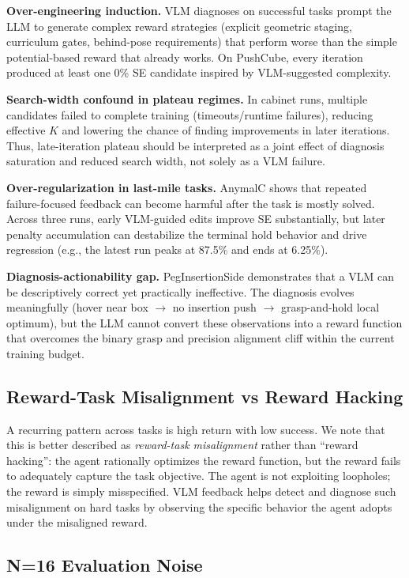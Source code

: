 \documentclass[conference]{IEEEtran}
\begin{document}
\textbf{Over-engineering induction.} VLM diagnoses on successful tasks prompt
the LLM to generate complex reward strategies (explicit geometric staging,
curriculum gates, behind-pose requirements) that perform worse than the simple
potential-based reward that already works. On PushCube, every iteration produced
at least one 0\% SE candidate inspired by VLM-suggested complexity.

\textbf{Search-width confound in plateau regimes.} In cabinet runs, multiple
candidates failed to complete training (timeouts/runtime failures), reducing
effective $K$ and lowering the chance of finding improvements in later
iterations. Thus, late-iteration plateau should be interpreted as a joint effect
of diagnosis saturation and reduced search width, not solely as a VLM failure.

\textbf{Over-regularization in last-mile tasks.} AnymalC shows that repeated
failure-focused feedback can become harmful after the task is mostly solved.
Across three runs, early VLM-guided edits improve SE substantially, but later
penalty accumulation can destabilize the terminal hold behavior and drive
regression (e.g., the latest run peaks at 87.5\% and ends at 6.25\%).

\textbf{Diagnosis-actionability gap.} PegInsertionSide demonstrates that a VLM
can be descriptively correct yet practically ineffective. The diagnosis evolves
meaningfully (hover near box $\to$ no insertion push $\to$ grasp-and-hold local
optimum), but the LLM cannot convert these observations into a reward function
that overcomes the binary grasp and precision alignment cliff within the current
training budget.

\subsection{Reward-Task Misalignment vs Reward Hacking}

A recurring pattern across tasks is high return with low success. We note that
this is better described as \emph{reward-task misalignment} rather than
``reward hacking'': the agent rationally optimizes the reward function, but the
reward fails to adequately capture the task objective. The agent is not
exploiting loopholes; the reward is simply misspecified. VLM feedback helps
detect and diagnose such misalignment on hard tasks by observing the specific
behavior the agent adopts under the misaligned reward.

\subsection{N=16 Evaluation Noise}
\end{document}
